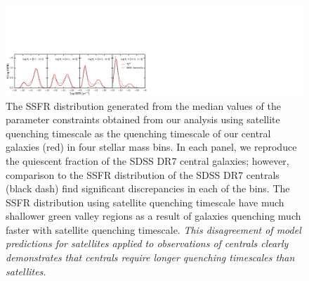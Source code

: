 \begin{figure}
\begin{center}
\includegraphics[width=\textwidth]{figs/cenq/SSFR_ABC_posterior_SatABC_TinkerFq_satellite_prior.pdf}
\caption{The SSFR distribution generated from the median values of the 
parameter constraints obtained from our analysis using \cite{Wetzel:2013aa} 
satellite quenching timescale as the quenching timescale of our 
central galaxies (red) in four stellar mass bins. In each panel, 
we reproduce the quiescent fraction of the SDSS DR7 central galaxies;
however, comparison to the SSFR distribution of the SDSS DR7 centrals 
(black dash) find significant discrepancies in each of the bins. 
The SSFR distribution using satellite quenching timescale have much 
shallower green valley regions as a result of galaxies quenching much 
faster with satellite quenching timescale. {\em This disagreement of 
model predictions for satellites applied to observations of centrals 
clearly demonstrates that centrals require longer quenching timescales 
than satellites.} 
}
\label{fig:ssfr_tau_sat}
\end{center}
\end{figure}

